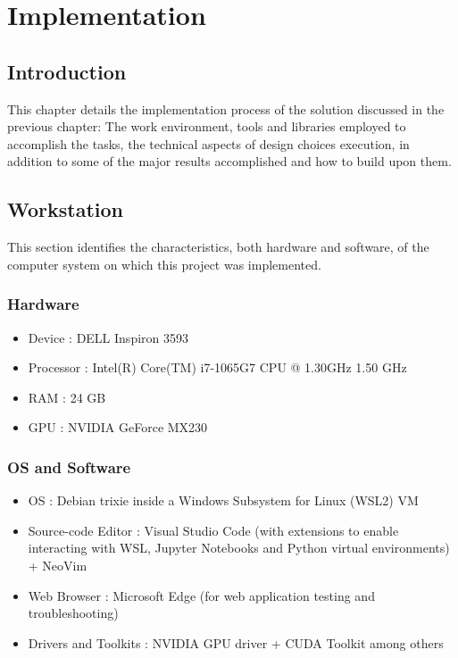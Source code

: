 \chapter{Implementation}

\section{Introduction}
This chapter details the implementation process of the solution discussed in the previous chapter: The work environment, tools and libraries employed to accomplish the tasks, the technical aspects of design choices execution, in addition to some of the major results accomplished and how to build upon them.

\section{Workstation}
This section identifies the characteristics, both hardware and software, of the computer system on which this project was implemented.
\bigskip
\subsection{Hardware}
\smallskip
\begin{itemize}
    \item Device : DELL Inspiron 3593
    \item Processor : Intel(R) Core(TM) i7-1065G7 CPU @ 1.30GHz   1.50 GHz
    \item RAM : 24 GB
    \item GPU : NVIDIA GeForce MX230
\end{itemize}
\medskip
\subsection{OS and Software}
\smallskip
\begin{itemize}
    \item OS : Debian trixie inside a Windows Subsystem for Linux (WSL2) VM
    \item Source-code Editor : Visual Studio Code (with extensions to enable interacting with WSL, Jupyter Notebooks and Python virtual environments) + NeoVim
    \item Web Browser : Microsoft Edge (for web application testing and troubleshooting)
    \item Drivers and Toolkits : NVIDIA GPU driver + CUDA Toolkit among others
\end{itemize}

